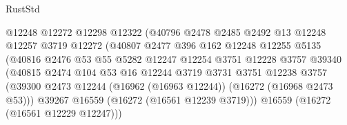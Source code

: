 \begin{lexlean}{RustStd}
\begin{coremodule}
                                      @12248
                                      @12272
                                      @12298
                                      @12322
                                      (@40796
                                        @2478
                                        @2485
                                        @2492
                                        @13
                                        @12248
                                        @12257
                                        @3719
                                        @12272
                                        (@40807
                                          @2477
                                          @396
                                          @162
                                          @12248
                                          @12255
                                          @5135
                                          (@40816
                                            @2476
                                            @53
                                            @55
                                            @5282
                                            @12247
                                            @12254
                                            @3751
                                            @12228
                                            @3757
                                            @39340
                                            (@40815
                                              @2474
                                              @104
                                              @53
                                              @16
                                              @12244
                                              @3719
                                              @3731
                                              @3751
                                              @12238
                                              @3757
                                              (@39300
                                                @2473
                                                @12244
                                                (@16962 (@16963 @12244))
                                                (@16272 (@16968 @2473 @53)))
                                              @39267
                                              @16559
                                              (@16272 (@16561 @12239 @3719)))
                                            @16559
                                            (@16272 (@16561 @12229 @12247)))

\end{coremodule}
\end{lexlean}
